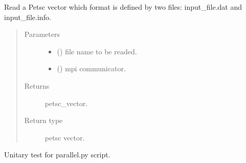 \documentclass[letterpaper,10pt,english]{sphinxmanual}
\begin{document}
\begin{fulllineitems}
\label{\detokenize{petgem/parallel:petgem.parallel.readPetscVector}}
Read a Petsc vector which format is defined by two files: input\_file.dat and input\_file.info.
\begin{quote}\begin{description}
\item[{Parameters}] \leavevmode\begin{itemize}
\item {} 
 () \textendash{} file name to be readed.

\item {} 
 () \textendash{} mpi communicator.

\end{itemize}

\item[{Returns}] \leavevmode
petsc\_vector.

\item[{Return type}] \leavevmode
petsc vector.

\end{description}\end{quote}

\end{fulllineitems}


\begin{fulllineitems}
\label{\detokenize{petgem/parallel:petgem.parallel.unitary_test}}
Unitary test for parallel.py script.

\end{fulllineitems}

\end{document}
